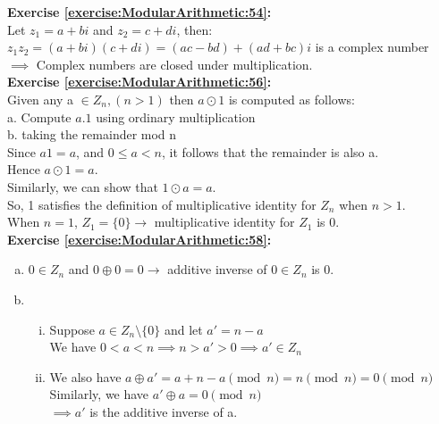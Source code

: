 \noindent\textbf{Exercise \ref{exercise:ModularArithmetic:54}:}\\
Let $z_1=a+bi$ and $z_2=c+di$, then:\\
$z_1z_2=(a+bi)(c+di)=(ac-bd)+(ad+bc)i$ is a complex number\\
$\implies$  Complex numbers are closed under multiplication.\\

\noindent\textbf{Exercise \ref{exercise:ModularArithmetic:56}:}\\ 
Given any a $\in Z_n, (n>1)$ then $a \odot 1$ is computed as follows:\\
a. Compute $a.1$ using ordinary multiplication\\
b. taking the remainder mod n \\
Since $a1=a$, and $0 \le a <n$, it follows that the remainder is also a.\\
Hence $a \odot 1=a$.\\
Similarly, we can show that $1 \odot a=a$.\\
So, 1 satisfies the definition of multiplicative identity for $Z_n$ when $n>1$.\\
When $n=1$, $Z_1=\{0\} \to$ multiplicative identity for $Z_1$ is 0.\\

\noindent\textbf{Exercise \ref{exercise:ModularArithmetic:58}:}
\begin{enumerate}[(a)]
\item
$0 \in Z_n$ and $0 \oplus 0=0 \to$ additive inverse of $0 \in Z_n$ is 0.

\item
	\begin{enumerate}[(i)]
	\item
	Suppose $a \in Z_n \setminus \{0\}$ and let $a'=n-a$\\
	We have $0<a<n \implies n>a'>0 \implies a' \in Z_n$
	
	\item
	We also have $a \oplus a'=a+n-a \pmod{n}=n \pmod{n}=0 \pmod{n}$\\
	Similarly, we have $a' \oplus a=0 \pmod{n}$\\
	$\implies a'$ is the additive inverse of a.
	\end{enumerate}
\end{enumerate}

